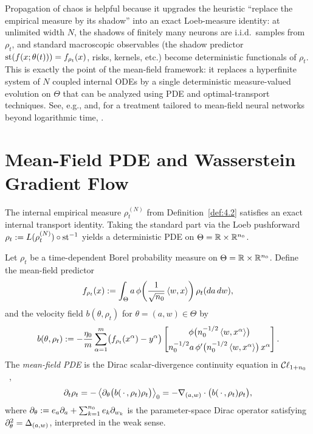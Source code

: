 Propagation of chaos is helpful because it upgrades the heuristic ``replace the empirical measure by its shadow'' into an exact Loeb-measure identity: at unlimited width $N$, the shadows of finitely many neurons are i.i.d.\ samples from $\rho_t$, and standard macroscopic observables (the shadow predictor $\operatorname{st}(f(x; \theta(t))) = f_{\rho_t}(x)$, risks, kernels, etc.) become deterministic functionals of $\rho_t$. This is exactly the point of the mean-field framework: it replaces a hyperfinite system of $N$ coupled internal ODEs by a single deterministic measure-valued evolution on $\Theta$ that can be analyzed using PDE and optimal-transport techniques. See, e.g., \cite{sznitman1991topics,jabin2018quantitative,chaintron2022propagation} and, for a treatment tailored to mean-field neural networks beyond logarithmic time, \cite{glasgow2025propagation}.

\section{Mean-Field PDE and Wasserstein Gradient Flow}
\label{sec:4.3}

The internal empirical measure $\rho_t^{(N)}$ from Definition~\ref{def:4.2} satisfies an exact internal transport identity. Taking the standard part via the Loeb pushforward $\rho_t := L(\rho_t^{(N)}) \circ \operatorname{st}^{-1}$ yields a deterministic PDE on $\Theta = \mathbb{R} \times \mathbb{R}^{n_0}$.

\begin{definition}\label{def:4.4}
Let $\rho_t$ be a time-dependent Borel probability measure on $\Theta = \mathbb{R} \times \mathbb{R}^{n_0}$. Define the mean-field predictor
\begin{equation}\label{eq:4.21}
f_{\rho_t}(x) := \int_\Theta a\,\phi\!\left(\frac{1}{\sqrt{n_0}}\left\langle w, x \right\rangle\right) \rho_t(da\,dw),
\end{equation}
and the velocity field $b(\theta, \rho_t)$ for $\theta = (a, w) \in \Theta$ by
\begin{equation}\label{eq:4.22}
b(\theta, \rho_t) := -\frac{\eta_0}{m}\sum_{\alpha=1}^m \bigl(f_{\rho_t}(x^\alpha) - y^\alpha\bigr)
\begin{bmatrix}
\phi\bigl(n_0^{-1/2}\left\langle w, x^\alpha \right\rangle\bigr) \\[0.4em]
n_0^{-1/2} a\,\phi'\bigl(n_0^{-1/2}\left\langle w, x^\alpha \right\rangle\bigr)\,x^\alpha
\end{bmatrix}.
\end{equation}
The \emph{mean-field PDE} is the Dirac scalar-divergence continuity equation in $\mathcal{C}\ell_{1+n_0}$~\cite{hestenes1984clifford,brackx1982clifford},
\begin{equation}\label{eq:4.23}
\partial_t \rho_t = -\left\langle \partial_\theta\bigl(b(\,\cdot\,, \rho_t)\rho_t\bigr) \right\rangle_0 = -\nabla_{(a, w)} \cdot \bigl(b(\,\cdot\,, \rho_t)\rho_t\bigr),
\end{equation}
where $\partial_\theta := e_a \partial_a + \sum_{k=1}^{n_0} e_k \partial_{w_k}$ is the parameter-space Dirac operator satisfying $\partial_\theta^2 = \Delta_{(a,w)}$, interpreted in the weak sense.
\end{definition}

